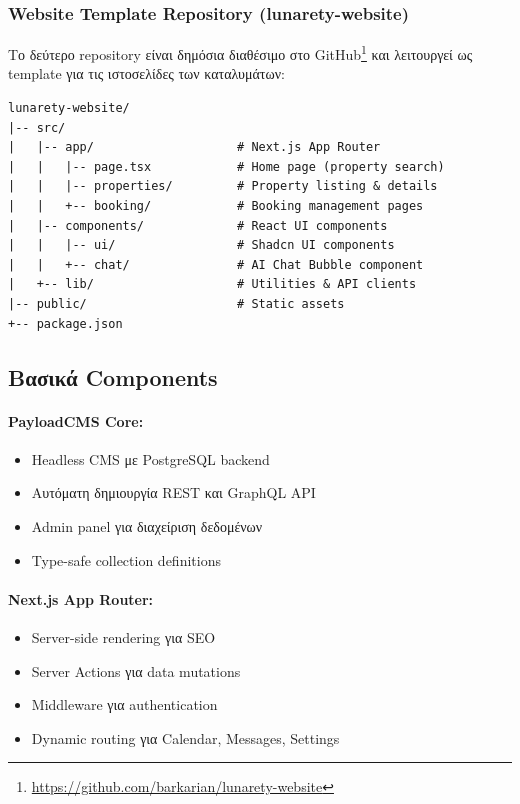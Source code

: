 \documentclass[
	12pt, %
	oneside, %
	greek,
	onehalfspacing, %
	liststotoc, %
	toctotoc, %
	parskip, %
	headsepline, %
]{MastersDoctoralThesis} %
\begin{document}
\subsubsection{Website Template Repository (lunarety-website)}

Το δεύτερο repository είναι δημόσια διαθέσιμο στο GitHub\footnote{\url{https://github.com/barkarian/lunarety-website}} και λειτουργεί ως template για τις ιστοσελίδες των καταλυμάτων:

\begin{english}
\begin{lstlisting}[style=text,caption={Δομή καταλόγων του Website Template (lunarety-website)}]
lunarety-website/
|-- src/
|   |-- app/                    # Next.js App Router
|   |   |-- page.tsx            # Home page (property search)
|   |   |-- properties/         # Property listing & details
|   |   +-- booking/            # Booking management pages
|   |-- components/             # React UI components
|   |   |-- ui/                 # Shadcn UI components
|   |   +-- chat/               # AI Chat Bubble component
|   +-- lib/                    # Utilities & API clients
|-- public/                     # Static assets
+-- package.json
\end{lstlisting}
\end{english}

\subsection{Βασικά Components}
\label{subsec:basic-components}

\paragraph{PayloadCMS Core:}
\begin{itemize}
    \item Headless CMS με PostgreSQL backend
    \item Αυτόματη δημιουργία REST και GraphQL API
    \item Admin panel για διαχείριση δεδομένων
    \item Type-safe collection definitions
\end{itemize}

\paragraph{Next.js App Router:}
\begin{itemize}
    \item Server-side rendering για SEO
    \item Server Actions για data mutations
    \item Middleware για authentication
    \item Dynamic routing για Calendar, Messages, Settings
\end{itemize}
\end{document}
